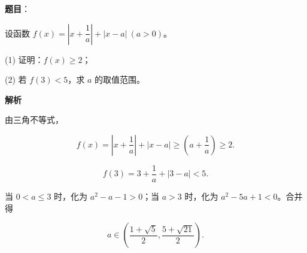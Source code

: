 \begin{answer}

\textbf{题目}：

设函数 $f(x)=\left|x+\dfrac1a\right|+|x-a|\ (a>0)$。

(1) 证明：$f(x)\geqslant2$；

(2) 若 $f(3)<5$，求 $a$ 的取值范围。

\textbf{解析}


由三角不等式，

\nopagebreak[4]
\[
f(x)=\left|x+\frac1a\right|+|x-a|\geqslant\left(a+\frac1a\right)\geqslant2.
\]


\nopagebreak[4]
\[
f(3)=3+\frac1a+|3-a|<5.
\]

当 $0<a\leqslant3$ 时，化为 $a^2-a-1>0$；当 $a>3$ 时，化为 $a^2-5a+1<0$。合并得

\nopagebreak[4]
\[
a\in\left(\frac{1+\sqrt5}{2},\frac{5+\sqrt{21}}2\right).
\]



\end{answer}